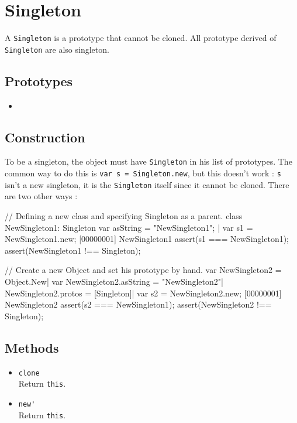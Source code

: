 \section{Singleton}

A \lstinline{Singleton} is a prototype that cannot be cloned. All
prototype derived of \lstinline{Singleton} are also singleton.

\subsection{Prototypes}
\begin{itemize}
\item {}
\end{itemize}

\subsection{Construction}

To be a singleton, the object must have \lstinline{Singleton} in his
list of prototypes. The common way to do this is \lstinline{var s = Singleton.new},
but this doesn't work : \lstinline|s| isn't a new singleton, it is the
\lstinline|Singleton| itself since it cannot be cloned. There are two
other ways :


\begin{urbiscript}
// Defining a new class and specifying Singleton as a parent.
class NewSingleton1: Singleton
{
  var asString = "NewSingleton1";
}|
var s1 = NewSingleton1.new;
[00000001] NewSingleton1
assert(s1 === NewSingleton1);
assert(NewSingleton1 !== Singleton);

// Create a new Object and set his prototype by hand.
var NewSingleton2 = Object.New|
var NewSingleton2.asString = "NewSingleton2"|
NewSingleton2.protos = [Singleton]|
var s2 = NewSingleton2.new;
[00000001] NewSingleton2
assert(s2 === NewSingleton1);
assert(NewSingleton2 !== Singleton);
\end{urbiscript}

\subsection{Methods}
\begin{itemize}
\item \lstinline|clone|\\
  Return \lstinline|this|.

\item \lstinline|new'|\\
  Return \lstinline|this|.
\end{itemize}

